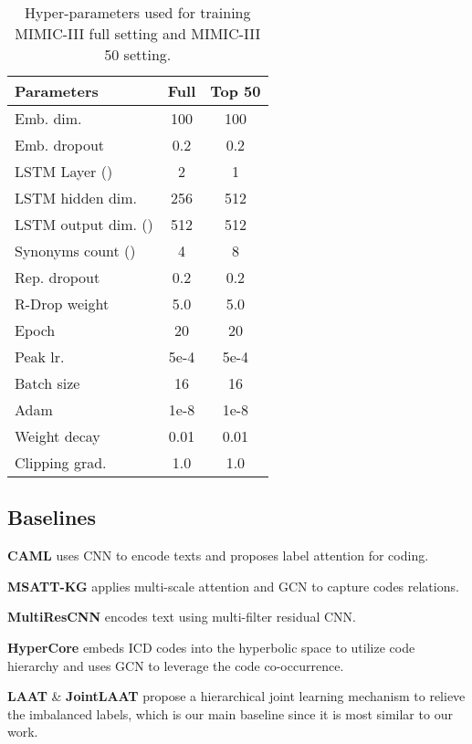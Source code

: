 \documentclass[11pt]{article}
\begin{document}
\begin{table}
\centering
\small
\begin{tabular}{lcc}
\toprule
Parameters & Full & Top 50 \\
\midrule
Emb. dim. & 100 & 100 \\
Emb. dropout & 0.2 & 0.2 \\
LSTM Layer () & 2 & 1 \\
LSTM hidden dim. & 256 & 512 \\
LSTM output dim. () & 512 & 512 \\
Synonyms count () & 4 & 8 \\
Rep. dropout & 0.2 & 0.2 \\
R-Drop weight & 5.0 & 5.0 \\
Epoch & 20 & 20  \\
Peak lr. & 5e-4 & 5e-4 \\
Batch size & 16 & 16 \\
Adam  & 1e-8 & 1e-8 \\
Weight decay & 0.01 & 0.01 \\
Clipping grad. & 1.0 & 1.0 \\
\bottomrule
\end{tabular}
\caption{Hyper-parameters used for training MIMIC-III full setting and MIMIC-III 50 setting.
}
\label{hyper para}
\end{table}


\subsection{Baselines}


\noindent\textbf{CAML} \cite{mullenbach-etal-2018-explainable} uses CNN to encode texts and proposes label attention for coding.

\noindent\textbf{MSATT-KG} \cite{xie2019ehr} applies multi-scale attention and GCN to capture codes relations.

\noindent\textbf{MultiResCNN} \cite{li2020icd} encodes text using multi-filter residual CNN.

\noindent\textbf{HyperCore} \cite{cao2020hypercore} embeds ICD codes into the hyperbolic space to utilize code hierarchy and uses GCN to leverage the code co-occurrence.

\noindent\textbf{LAAT} \& \noindent\textbf{JointLAAT} \cite{ijcai2020-461-vu} propose a hierarchical joint learning mechanism to relieve the imbalanced labels, which is our main baseline since it is most similar to our work.
\end{document}
